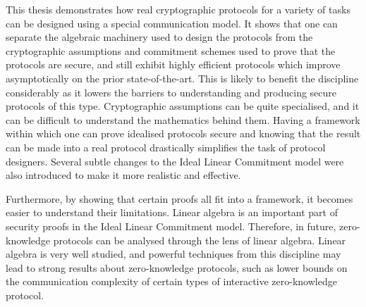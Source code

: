 
This thesis demonstrates how real cryptographic protocols for a variety of tasks can be designed using a special communication model. It shows that one can separate the algebraic machinery used to design the protocols from the cryptographic assumptions and commitment schemes used to prove that the protocols are secure, and still exhibit highly efficient protocols which improve asymptotically on the prior state-of-the-art. This is likely to benefit the discipline considerably as it lowers the barriers to understanding and producing secure protocols of this type. Cryptographic assumptions can be quite specialised, and it can be difficult to understand the mathematics behind them. Having a framework within which one can prove idealised protocols secure and knowing that the result can be made into a real protocol drastically simplifies the task of protocol designers. Several subtle changes to the Ideal Linear Commitment model were also introduced to make it more realistic and effective.

Furthermore, by showing that certain proofs all fit into a framework, it becomes easier to understand their limitations. Linear algebra is an important part of security proofs in the Ideal Linear Commitment model. Therefore, in future, zero-knowledge protocols can be analysed through the lens of linear algebra. Linear algebra is very well studied, and powerful techniques from this discipline may lead to strong results about zero-knowledge protocols, such as lower bounds on the communication complexity of certain types of interactive zero-knowledge protocol.


